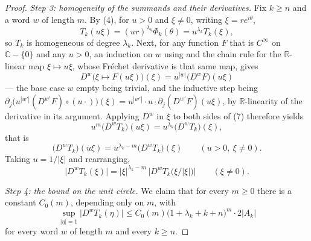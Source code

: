 \begin{proof}
\emph{Step 3: homogeneity of the summands and their derivatives.}  Fix $k\ge n$
and a word $w$ of length $m$.  By (4), for $u>0$ and $\xi\neq0$, writing
$\xi=re^{i\theta}$,
\begin{equation}\tag{7}
  T_k(u\xi)=(ur)^{\lambda_k}\Phi_k(\theta)=u^{\lambda_k}T_k(\xi),
\end{equation}
so $T_k$ is homogeneous of degree $\lambda_k$.  Next, for any function $F$ that
is $C^\infty$ on $\mathbb{C}-\{0\}$ and any $u>0$, an induction on $w$ using
 and the chain rule for the $\mathbb{R}$-linear map
$\xi\mapsto u\xi$, whose Fréchet derivative is that same map, gives
\[
  D^{w}\bigl(\xi\mapsto F(u\xi)\bigr)(\xi)=u^{|w|}\bigl(D^{w}F\bigr)(u\xi)
\]
--- the base case $w$ empty being trivial, and the inductive step being
$\partial_j\bigl(u^{|w'|}(D^{w'}F)\circ(u\cdot)\bigr)(\xi)
=u^{|w'|}\cdot u\cdot\partial_j(D^{w'}F)(u\xi)$, by
$\mathbb{R}$-linearity of the derivative in its argument.  Applying $D^{w}$ in
$\xi$ to both sides of (7) therefore yields
\[
  u^{m}\bigl(D^{w}T_k\bigr)(u\xi)=u^{\lambda_k}\bigl(D^{w}T_k\bigr)(\xi),
\]
that is
\begin{equation}\tag{8}
  \bigl(D^{w}T_k\bigr)(u\xi)=u^{\lambda_k-m}\bigl(D^{w}T_k\bigr)(\xi)
  \qquad(u>0,\ \xi\neq0).
\end{equation}
Taking $u=1/|\xi|$ and rearranging,
\begin{equation}\tag{9}
  \bigl|D^{w}T_k(\xi)\bigr|
  =|\xi|^{\lambda_k-m}\,\bigl|D^{w}T_k\bigl(\xi/|\xi|\bigr)\bigr|
  \qquad(\xi\neq0).
\end{equation}

\emph{Step 4: the bound on the unit circle.}  We claim that for every $m\ge0$
there is a constant $C_0(m)$, depending only on $m$, with
\begin{equation}\tag{10}
  \sup_{|\eta|=1}\bigl|D^{w}T_k(\eta)\bigr|
  \le C_0(m)\bigl(1+\lambda_k+k+n\bigr)^{m}\cdot2|A_k|
\end{equation}
for every word $w$ of length $m$ and every $k\ge n$.


\end{proof}

